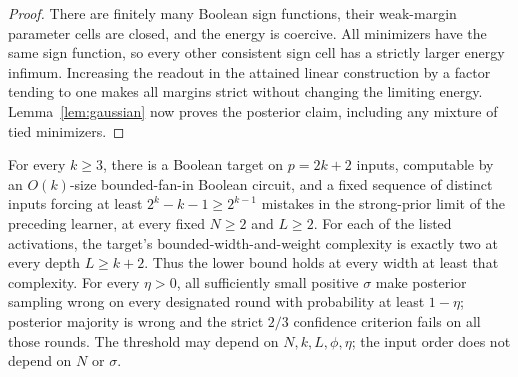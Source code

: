 \begin{proof}
There are finitely many Boolean sign functions, their weak-margin
parameter cells are closed, and the energy is coercive. All minimizers
have the same sign function, so every other consistent sign cell has a
strictly larger energy infimum. Increasing the readout in the attained
linear construction by a factor tending to one makes all margins
strict without changing the limiting energy. Lemma~\ref{lem:gaussian} now proves the posterior claim, including
any mixture of tied minimizers.
\end{proof}

\begin{theorem}\label{thm:mixed}
For every $k\ge3$, there is a Boolean target on $p=2k+2$ inputs,
computable by an $O(k)$-size bounded-fan-in Boolean circuit, and a fixed
sequence of distinct inputs forcing at least
$2^k-k-1\ge2^{k-1}$ mistakes in the strong-prior limit of the preceding
learner, at every fixed $N\ge2$ and $L\ge2$.
For each of the listed activations, the target's bounded-width-and-weight
complexity is exactly two at every depth $L\ge k+2$.
Thus the lower bound holds at every width at least that complexity.
For every $\eta>0$, all sufficiently small positive $\sigma$ make
posterior sampling wrong on every designated round with probability at
least $1-\eta$; posterior majority is wrong and the strict $2/3$
confidence criterion fails on all those rounds. The threshold may depend
on $N,k,L,\phi,\eta$; the input order does not depend on $N$ or $\sigma$.
\end{theorem}
